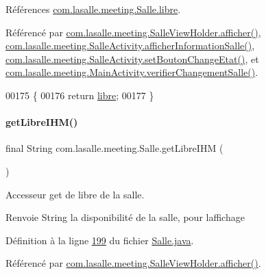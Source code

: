 Références \hyperlink{_salle_8java_source_l00037}{com.\+lasalle.\+meeting.\+Salle.\+libre}.



Référencé par \hyperlink{_salle_view_holder_8java_source_l00077}{com.\+lasalle.\+meeting.\+Salle\+View\+Holder.\+afficher()}, \hyperlink{_salle_activity_8java_source_l00103}{com.\+lasalle.\+meeting.\+Salle\+Activity.\+afficher\+Information\+Salle()}, \hyperlink{_salle_activity_8java_source_l00085}{com.\+lasalle.\+meeting.\+Salle\+Activity.\+set\+Bouton\+Change\+Etat()}, et \hyperlink{_main_activity_8java_source_l00291}{com.\+lasalle.\+meeting.\+Main\+Activity.\+verifier\+Changement\+Salle()}.


\begin{DoxyCode}
00175     \{
00176         \textcolor{keywordflow}{return} \hyperlink{classcom_1_1lasalle_1_1meeting_1_1_salle_a2965cb92b06dcdd28a07fa550259b1c1}{libre};
00177     \}
\end{DoxyCode}
\mbox{\label{classcom_1_1lasalle_1_1meeting_1_1_salle_ab86dfb73018e96230ceed49e207a8971}} 
\paragraph{\texorpdfstring{get\+Libre\+I\+H\+M()}{getLibreIHM()}}
{\footnotesize\ttfamily final String com.\+lasalle.\+meeting.\+Salle.\+get\+Libre\+I\+HM (\begin{DoxyParamCaption}{ }\end{DoxyParamCaption})}



Accesseur get de libre de la salle. 

\begin{DoxyReturn}{Renvoie}
String la disponibilité de la salle, pour l\textquotesingle{}affichage 
\end{DoxyReturn}


Définition à la ligne \hyperlink{_salle_8java_source_l00199}{199} du fichier \hyperlink{_salle_8java_source}{Salle.\+java}.



Référencé par \hyperlink{_salle_view_holder_8java_source_l00077}{com.\+lasalle.\+meeting.\+Salle\+View\+Holder.\+afficher()}.


